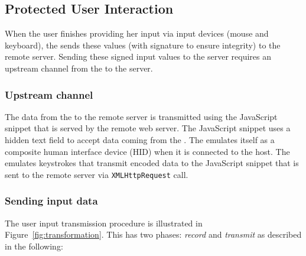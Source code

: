  

\subsection{Protected User Interaction}
\label{sec:systemDesign:commit}

When the user finishes providing her input via input devices (mouse and keyboard), the \device sends these values (with signature to ensure integrity) to the remote server. Sending these signed input values to the server requires an upstream channel from the \device to the server.

\subsubsection{\bfseries Upstream channel}\label{sec:systemDesign:commit:upload} The data from the \device to the remote server is transmitted using the \name JavaScript snippet that is served by the remote web server. The \name JavaScript snippet uses a hidden text field to accept data coming from the \device. The \device emulates itself as a composite human interface device (HID) when it is connected to the host. The \device emulates keystrokes that transmit encoded data to the \name JavaScript snippet that is sent to the remote server via \texttt{XMLHttpRequest} call.

\subsubsection{\bfseries Sending input data}\label{sec:systemDesign:commit:send}
The user input transmission procedure is illustrated in Figure~\ref{fig:transformation}. This has two phases: \emph{record} and \emph{transmit} as described in the following:

